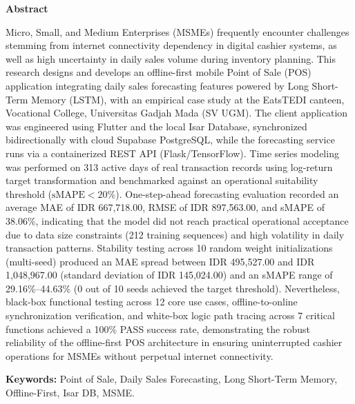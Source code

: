 \documentclass[10pt,a4paper]{article}
\begin{document}
\vspace{1pt}
\noindent{\color{dividerblue}\rule{\textwidth}{1.5pt}}
\vspace{1pt}

{\fontsize{13pt}{15pt}\bfseries Abstract\par}
\vspace{3pt}

{\fontsize{9.5pt}{12pt}\selectfont
Micro, Small, and Medium Enterprises (MSMEs) frequently encounter challenges stemming from internet connectivity dependency in digital cashier systems, as well as high uncertainty in daily sales volume during inventory planning. This research designs and develops an offline-first mobile Point of Sale (POS) application integrating daily sales forecasting features powered by Long Short-Term Memory (LSTM), with an empirical case study at the EatsTEDI canteen, Vocational College, Universitas Gadjah Mada (SV UGM). The client application was engineered using Flutter and the local Isar Database, synchronized bidirectionally with cloud Supabase PostgreSQL, while the forecasting service runs via a containerized REST API (Flask/TensorFlow). Time series modeling was performed on 313 active days of real transaction records using log-return target transformation and benchmarked against an operational suitability threshold ($\text{sMAPE} < 20\%$). One-step-ahead forecasting evaluation recorded an average MAE of IDR 667,718.00, RMSE of IDR 897,563.00, and sMAPE of 38.06\%, indicating that the model did not reach practical operational acceptance due to data size constraints (212 training sequences) and high volatility in daily transaction patterns. Stability testing across 10 random weight initializations (multi-seed) produced an MAE spread between IDR 495,527.00 and IDR 1,048,967.00 (standard deviation of IDR 145,024.00) and an sMAPE range of 29.16\%--44.63\% (0 out of 10 seeds achieved the target threshold). Nevertheless, black-box functional testing across 12 core use cases, offline-to-online synchronization verification, and white-box logic path tracing across 7 critical functions achieved a 100\% PASS success rate, demonstrating the robust reliability of the offline-first POS architecture in ensuring uninterrupted cashier operations for MSMEs without perpetual internet connectivity.\par}

\vspace{4pt}
{\fontsize{9.5pt}{12pt}\selectfont\textbf{Keywords:} Point of Sale, Daily Sales Forecasting, Long Short-Term Memory, Offline-First, Isar DB, MSME.\par}
\vspace{6pt}
\noindent{\color{dividerblue}\rule{\textwidth}{0.8pt}}
\vspace{8pt}
\end{document}

